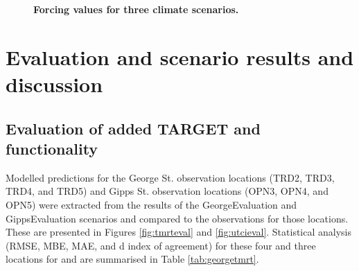 \documentclass[final,3p,times,authoryear]{elsarticle}
\begin{document}
\begin{figure}[!htbp]
\caption{\bf Forcing values for three climate scenarios. }    
 \label{fig:sunburyforcing} 
\end{figure} 




\section{Evaluation and scenario results and discussion}

\subsection{Evaluation of added TARGET  and  functionality}\label{sec:eval-htc}


Modelled predictions for the George St. observation locations (TRD2, TRD3, TRD4, and TRD5) and Gipps St. observation locations (OPN3, OPN4, and OPN5) were extracted from the results of the GeorgeEvaluation and GippsEvaluation scenarios and compared to the observations for those locations. These are presented in Figures \ref{fig:tmrteval} and \ref{fig:utcieval}. Statistical analysis (RMSE, MBE, MAE, and d index of agreement) for these four and three locations for  and  are summarised in Table \ref{tab:georgetmrt}.
\end{document}
